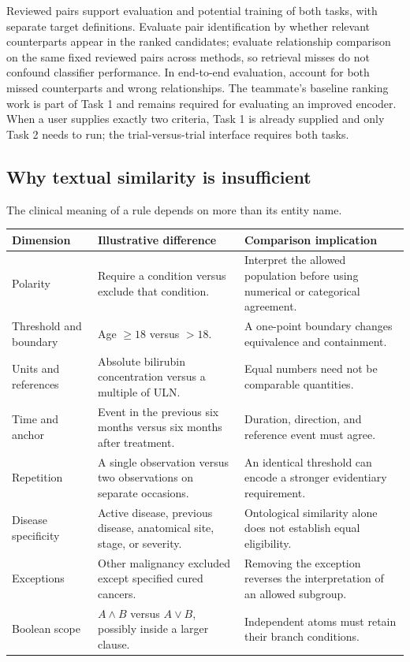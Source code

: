 \documentclass[10pt,letterpaper]{article}
\begin{document}
Reviewed pairs support evaluation and potential training of both tasks, with
separate target definitions. Evaluate pair identification by whether relevant
counterparts appear in the ranked candidates; evaluate relationship comparison
on the same fixed reviewed pairs across methods, so retrieval misses do not
confound classifier performance. In end-to-end evaluation, account for both
missed counterparts and wrong relationships. The teammate's baseline ranking
work is part of Task 1 and remains required for evaluating an improved encoder.
When a user supplies exactly two criteria, Task 1 is already supplied and only
Task 2 needs to run; the trial-versus-trial interface requires both tasks.

\subsection{Why textual similarity is insufficient}
The clinical meaning of a rule depends on more than its entity name.
\begin{longtable}{L{.20\linewidth}L{.34\linewidth}L{.37\linewidth}}
\toprule Dimension & Illustrative difference & Comparison implication\\\midrule
\endhead
Polarity & Require a condition versus exclude that condition. & Interpret the allowed population before using numerical or categorical agreement.\\
Threshold and boundary & Age $\geq18$ versus $>18$. & A one-point boundary changes equivalence and containment.\\
Units and references & Absolute bilirubin concentration versus a multiple of ULN. & Equal numbers need not be comparable quantities.\\
Time and anchor & Event in the previous six months versus six months after treatment. & Duration, direction, and reference event must agree.\\
Repetition & A single observation versus two observations on separate occasions. & An identical threshold can encode a stronger evidentiary requirement.\\
Disease specificity & Active disease, previous disease, anatomical site, stage, or severity. & Ontological similarity alone does not establish equal eligibility.\\
Exceptions & Other malignancy excluded except specified cured cancers. & Removing the exception reverses the interpretation of an allowed subgroup.\\
Boolean scope & $A\land B$ versus $A\lor B$, possibly inside a larger clause. & Independent atoms must retain their branch conditions.\\\bottomrule
\end{longtable}
\end{document}

